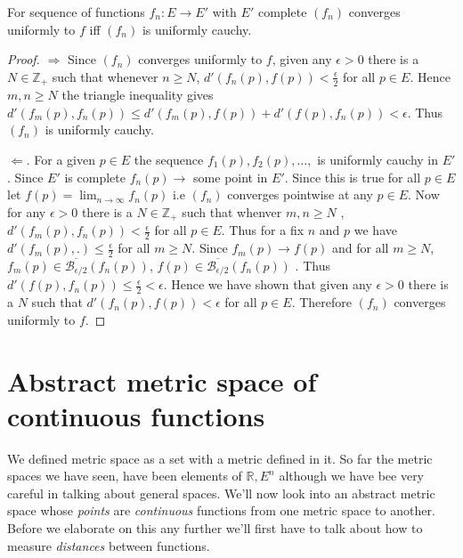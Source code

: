\begin{Theorem}[name=Completeness of sequence of functions]
    For sequence of functions $f_n : E \to E'$ with $E'$ complete $\left(f_n\right)$ converges
    uniformly to $f$ iff $\left(f_n\right)$ is uniformly cauchy. 
\end{Theorem}
\begin{proof}
    $\Rightarrow$ Since $\left(f_n\right)$ converges uniformly to $f$, given any $\epsilon > 0$
    there is a $N \in \mathbb{Z}_+$ such that whenever $n \geq N$, $d'(f_n(p),f(p)) <
    \frac{\epsilon}{2}$ for all $p \in E$. Hence $m,n \geq N$ the triangle inequality gives
    $d'(f_m(p),f_n(p)) \leq d'(f_m(p),f(p)) + d'(f(p),f_n(p)) < \epsilon$. Thus $\left(f_n\right)$ is
    uniformly cauchy. 

    $\Leftarrow$. For a given $p \in E$ the sequence $f_1(p), f_2(p), \dots , $ is uniformly cauchy in
    $E'$. Since $E'$ is complete $f_n(p) \to $ some point in $E'$. Since this is true for all $p \in E$ let
    $f(p) = \lim_{n \to \infty}f_n(p)$ i.e $\left(f_n\right)$ converges pointwise at any $p \in E$.
    Now for any $\epsilon > 0$ there is a $N \in \mathbb{Z}_+$ such that whenver 
    $m,n \geq N$ , $d'(f_m(p),f_n(p)) < \frac{\epsilon}{2}$ for all $p \in E$. Thus for a fix $n$
    and $p$ we have $d'(f_m(p),. ) \leq \frac{\epsilon}{2}$ for all $m \geq N$. Since 
    $f_m(p) \to f(p)$ and for all $m \geq N$, $f_m(p) \in \overline{\mathcal{B}_{\epsilon /2}}(f_n(p))$,
    $f(p) \in \overline{\mathcal{B}_{\epsilon /2}}(f_n(p))$ . Thus $d'(f(p),f_n(p)) \leq \frac{\epsilon}{2} <
    \epsilon$. Hence we have shown that given any $\epsilon > 0$ there is a $N$ such that
    $d'(f_n(p),f(p)) < \epsilon$ for all $p \in E$. Therefore $\left(f_n\right)$ converges uniformly
    to $f$.  
\end{proof}

\section{Abstract metric space of continuous functions}
We defined metric space as a set with a metric defined in it. So far the metric spaces we have seen,
have been elements of $\mathbb{R},E^n$ although we have bee very careful in talking about general
spaces. We'll now look into an abstract metric space whose \emph{points} are \textit{continuous}
functions from one metric space to another. Before we elaborate on this any further we'll first have
to talk about how to measure \emph{distances} between functions.

